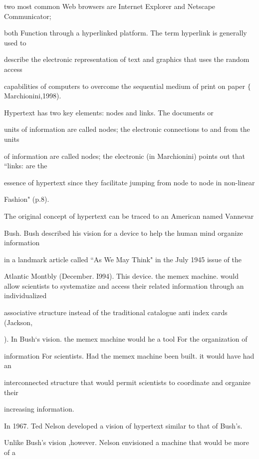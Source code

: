 \documentclass{book} %
\begin{document}
\begin{flushleft}
\noindent two most common Web browsers are Internet Explorer and Netscape Communicator;

\noindent both Function through a hyperlinked platform. The term hyperlink is generally used to

\noindent describe the electronic representation of text and graphics that uses the random access

\noindent capabilities of computers to overcome the sequential medium of print on paper $\mathrm{\{}$Marchionini,1998).

\noindent Hypertext has two key elements: nodes and links. The documents or

\noindent units of information are called nodes; the electronic connections to and from the units

\noindent of information are called nodes; the electronic (in Marchionini) points out that ``links: are the

\noindent essence of hypertext since they facilitate jumping from node to node in non-linear

\noindent Fashion" (p.8).

\noindent      The original concept of hypertext can be traced to an American named Vannevar

\noindent Bush. Bush described his vision for a device to help the human mind organize information

\noindent in a landmark article called ``As We May Think" in the July 1945 issue of the

\noindent Atlantic Montbly (December. I994). This device. the memex machine. would allow scientists to systematize and access their related information through an individualized

\noindent associative structure instead of the traditional catalogue anti index cards (Jackson,

). In Bush`s vision. the memex machine would he a tool For the organization of

\noindent information For scientists. Had the memex machine been built. it would have had an

\noindent interconnected structure that would permit scientists to coordinate and organize their

\noindent increasing information.

\noindent      In 1967. Ted Nelson developed a vision of hypertext similar to that of Bush's.

\noindent Unlike Bush's vision ,however. Nelson envisioned a machine that would be more of a


\end{flushleft}
\end{document}
